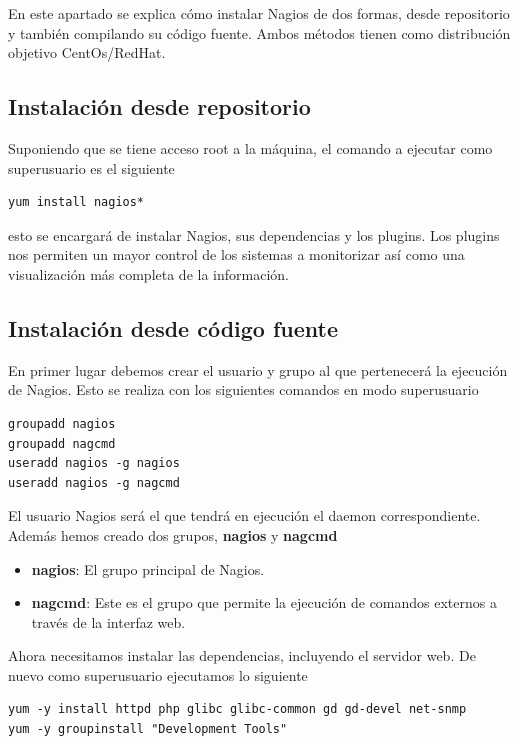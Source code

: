 \documentclass[11pt,a4paper]{article}
\begin{document}
En este apartado se explica cómo instalar Nagios de dos formas, desde repositorio y también compilando su código fuente. Ambos métodos tienen como distribución objetivo CentOs/RedHat.

\subsection{Instalación desde repositorio}

Suponiendo que se tiene acceso root a la máquina, el comando a ejecutar como superusuario es el siguiente

\begin{verbatim}
yum install nagios*
\end{verbatim}

esto se encargará de instalar Nagios, sus dependencias y los plugins. Los plugins nos permiten un mayor control de los sistemas a monitorizar así como una visualización más completa de la información.

\subsection{Instalación desde código fuente}

En primer lugar debemos crear el usuario y grupo al que pertenecerá la ejecución de Nagios. Esto se realiza con los siguientes comandos en modo superusuario

\begin{verbatim}
groupadd nagios
groupadd nagcmd
useradd nagios -g nagios
useradd nagios -g nagcmd
\end{verbatim}

El usuario Nagios será el que tendrá en ejecución el daemon correspondiente. Además hemos creado dos grupos, \textbf{nagios} y \textbf{nagcmd}

\begin{itemize}
\item \textbf{nagios}: El grupo principal de Nagios.
\item \textbf{nagcmd}: Este es el grupo que permite la ejecución de comandos externos a través de la interfaz web.
\end{itemize}

Ahora necesitamos instalar las dependencias, incluyendo el servidor web. De nuevo como superusuario ejecutamos lo siguiente

\begin{verbatim}
yum -y install httpd php glibc glibc-common gd gd-devel net-snmp
yum -y groupinstall "Development Tools"
\end{verbatim}
\end{document}
